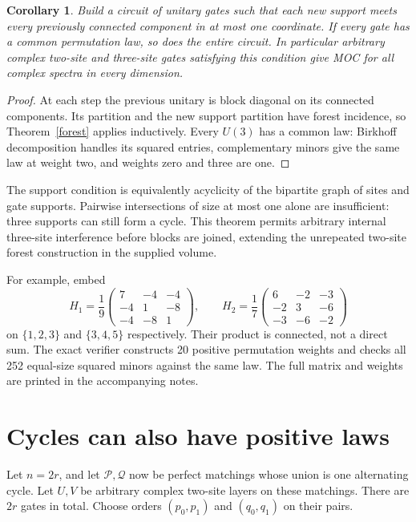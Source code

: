 \documentclass[11pt]{article}
\newtheorem{corollary}[theorem]{Corollary}
\begin{document}
\begin{corollary}\label{hypertree}
Build a circuit of unitary gates such that each new support meets every previously connected component in at most one coordinate. If every gate has a common permutation law, so does the entire circuit. In particular arbitrary complex two-site and three-site gates satisfying this condition give MOC for \emph{all complex spectra in every dimension}.
\end{corollary}
\begin{proof}
At each step the previous unitary is block diagonal on its connected components. Its partition and the new support partition have forest incidence, so Theorem~\ref{forest} applies inductively. Every $U(3)$ has a common law: Birkhoff decomposition handles its squared entries, complementary minors give the same law at weight two, and weights zero and three are one.
\end{proof}

The support condition is equivalently acyclicity of the bipartite graph of sites and gate supports. Pairwise intersections of size at most one alone are insufficient: three supports can still form a cycle. This theorem permits arbitrary internal three-site interference before blocks are joined, extending the unrepeated two-site forest construction in the supplied volume.

For example, embed
\[
H_1=\frac19\begin{pmatrix}7&-4&-4\\-4&1&-8\\-4&-8&1\end{pmatrix},
\qquad
H_2=\frac17\begin{pmatrix}6&-2&-3\\-2&3&-6\\-3&-6&-2\end{pmatrix}
\]
on $\{1,2,3\}$ and $\{3,4,5\}$ respectively. Their product is connected, not a direct sum. The exact verifier constructs 20 positive permutation weights and checks all 252 equal-size squared minors against the same law. The full matrix and weights are printed in the accompanying notes.

\section{Cycles can also have positive laws}
Let $n=2r$, and let $\mathcal P,\mathcal Q$ now be perfect matchings whose union is one alternating cycle. Let $U,V$ be arbitrary complex two-site layers on these matchings. There are $2r$ gates in total. Choose orders $(p_0,p_1)$ and $(q_0,q_1)$ on their pairs.
\end{document}
